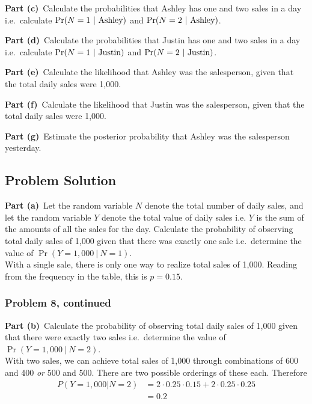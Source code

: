 \documentclass[12pt]{article}
\theoremstyle{definition}
\begin{document}
\bigskip
\noindent
{\bf Part (c)}\ Calculate the probabilities that Ashley has one and two sales in a day i.e.\ calculate $\Pr(N = 1\ |\ \hbox{Ashley})$ and $\Pr(N = 2\ |\ \hbox{Ashley})$.


\bigskip
\noindent
{\bf Part (d)}\ Calculate the probabilities that Justin has one and two sales in a day i.e.\ calculate $\Pr(N = 1\ |\ \hbox{Justin})$ and $\Pr(N = 2\ |\ \hbox{Justin})$.

\bigskip
\noindent
{\bf Part (e)}\ Calculate the likelihood that Ashley was the salesperson, given that the total daily sales were 1,000.


\bigskip
\noindent
{\bf Part (f)}\ Calculate the likelihood that Justin was the salesperson, given that the total daily sales were 1,000.



\bigskip
\noindent
{\bf Part (g)}\ Estimate the posterior probability that Ashley was the salesperson yesterday.


\subsection*{Problem Solution}

\bigskip
\noindent
{\bf Part (a)}\ Let the random variable $N$ denote the total number of daily sales, and let the random variable $Y$ denote the total value of daily sales i.e. $Y$ is the sum of the amounts of all the sales for the day. Calculate the probability of observing total daily sales of 1,000 given that there was exactly one sale i.e.\ determine the value of $\Pr(Y = 1,000\ |\ N = 1)$.\\

With a single sale, there is only one way to realize total sales of 1,000. Reading from the frequency in the table, this is $p = 0.15$.




\newpage
\subsubsection*{Problem 8, continued}
\noindent
{\bf Part (b)}\ Calculate the probability of observing total daily sales of 1,000 given that there were exactly two sales i.e.\ determine the value of $\Pr(Y = 1,000\ |\ N = 2)$.\\

With two sales, we can achieve total sales of 1,000 through combinations of 600 and 400 \textit{or} 500 and 500. There are two possible orderings of these each. Therefore \\
\begin{align*}
P(Y = 1,000 |N = 2) &= 2 \cdot 0.25 \cdot 0.15 + 2 \cdot 0.25 \cdot 0.25\\
&= 0.2
\end{align*}
\end{document}
